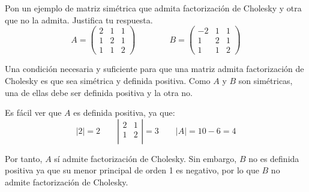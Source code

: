 \documentclass[12pt]{article}
\begin{document}
\begin{ejercicio} 
     Pon un ejemplo de matriz simétrica que admita factorización de Cholesky y otra que no la admita. Justifica tu respuesta.
     \begin{equation*}
         A = \left( \begin{array}{ccc}
             2 & 1 & 1 \\
             1 & 2 & 1 \\
             1 & 1 & 2
         \end{array}\right)
         \qquad \qquad
         B = \left( \begin{array}{ccc}
             -2 & 1 & 1 \\
             1 & 2 & 1 \\
             1 & 1 & 2
         \end{array}\right)
     \end{equation*}

     Una condición necesaria y suficiente para que una matriz admita factorización de Cholesky es que sea simétrica y definida positiva. Como $A$ y $B$ son simétricas, una de ellas debe ser definida positiva y la otra no.

     Es fácil ver que $A$ es definida positiva, ya que:
     \begin{equation*}
         |2|=2 \qquad \left| \begin{array}{cc}
             2 & 1 \\
             1 & 2 \\
         \end{array}\right| = 3 \qquad |A|=10-6=4
     \end{equation*}

     Por tanto, $A$ sí admite factorización de Cholesky. Sin embargo, $B$ no es definida positiva ya que su menor principal de orden 1 es negativo, por lo que $B$ no admite factorización de Cholesky.
\end{ejercicio}
\end{document}
